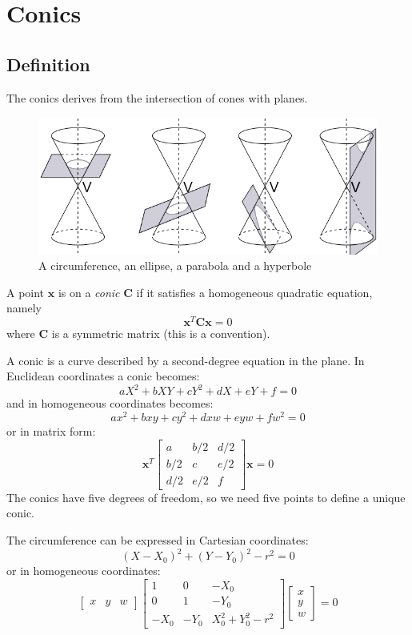 \documentclass[12pt, a4paper]{report}
\newtheorem[style=M,bodystyle=\normalfont]{theorem}{Theorem}
\newtheorem[style=M,bodystyle=\normalfont]{corollary}{Corollary}
\newtheorem[style=M,bodystyle=\normalfont]{lemma}{Lemma}
\newtheorem[style=M,bodystyle=\normalfont]{definition}{Definition}
\begin{document}
    \section{Conics}
    \subsection{Definition}
    The conics derives from the intersection of cones with planes. 
    \begin{figure}[H]
        \centering
        \includegraphics[width=0.75\linewidth]{images/conics.png}
        \caption{A circumference, an ellipse, a parabola and a hyperbole}
    \end{figure}
    \begin{definition}
        A point $\textbf{x}$ is on a \emph{conic} $\textbf{C}$ if it satisfies a homogeneous quadratic equation, namely
        \[\textbf{x}^T\textbf{C}\textbf{x}=0\]
        where $\textbf{C}$ is a symmetric matrix (this is a convention). 
    \end{definition}
    A conic is a curve described by a second-degree equation in the plane. In Euclidean coordinates a conic becomes: 
    \[aX^2+bXY+cY^2+dX+eY+f=0\]
    and in homogeneous coordinates becomes: 
    \[ax^2+bxy+cy^2+dxw+eyw+fw^2=0\]
    or in matrix form: 
    \[\textbf{x}^T \begin{bmatrix} a & b/2 & d/2 \\ b/2 & c & e/2 \\ d/2 & e/2 & f \end{bmatrix} \textbf{x}=0\]
    The conics have five degrees of freedom, so we need five points to define a unique conic. 
    \begin{example}
        The circumference can be expressed in Cartesian coordinates: 
        \[(X-X_0)^2+(Y-Y_0)^2-r^2=0\]
        or in homogeneous coordinates: 
        \[  \begin{bmatrix} x & y & w \end{bmatrix}
            \begin{bmatrix} 1 & 0 & -X_0 \\ 0 & 1 & -Y_0 \\ -X_0 & -Y_0 & X_0^2+Y_0^2-r^2 \end{bmatrix}
            \begin{bmatrix} x \\ y \\ w \end{bmatrix} = 0
        \]
    \end{example}
\end{document}
